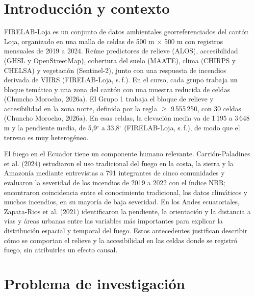 \documentclass[11pt,a4paper]{article}
\newcommand{\var}[1]{\texttt{\StrSubstitute{#1}{_}{\_\allowbreak}}}
\newcommand{\gr}[1]{$#1^{\circ}$}
\begin{document}
\section{Introducción y contexto}
FIRELAB-Loja es un conjunto de datos ambientales georreferenciados del cantón Loja, organizado en una malla de celdas de 500 m $\times$ 500 m con registros mensuales de 2019 a 2024. Reúne predictores de relieve (ALOS), accesibilidad (GHSL y OpenStreetMap), cobertura del suelo (MAATE), clima (CHIRPS y CHELSA) y vegetación (Sentinel-2), junto con una respuesta de incendios derivada de VIIRS (FIRELAB-Loja, s.\,f.). En el curso, cada grupo trabaja un bloque temático y una zona del cantón con una muestra reducida de celdas (Chuncho Morocho, 2026a). El Grupo 1 trabaja el bloque de relieve y accesibilidad en la zona norte, definida por la regla \var{centro_y_m} $\geq$ 9\,555\,250, con 30 celdas (Chuncho Morocho, 2026a). En esas celdas, la elevación media va de 1\,195 a 3\,648 m y la pendiente media, de 5,9\gr{} a 33,8\gr{} (FIRELAB-Loja, s.\,f.), de modo que el terreno es muy heterogéneo.

El fuego en el Ecuador tiene un componente humano relevante. Carrión-Paladines et al. (2024) estudiaron el uso tradicional del fuego en la costa, la sierra y la Amazonía mediante entrevistas a 791 integrantes de cinco comunidades y evaluaron la severidad de los incendios de 2019 a 2022 con el índice NBR; encontraron coincidencia entre el conocimiento tradicional, los datos climáticos y muchos incendios, en su mayoría de baja severidad. En los Andes ecuatoriales, Zapata-Rios et al. (2021) identificaron la pendiente, la orientación y la distancia a vías y áreas urbanas entre las variables más importantes para explicar la distribución espacial y temporal del fuego. Estos antecedentes justifican describir cómo se comportan el relieve y la accesibilidad en las celdas donde se registró fuego, sin atribuirles un efecto causal.

\section{Problema de investigación}
\end{document}
